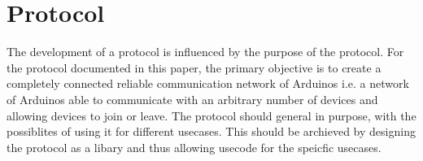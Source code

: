 \section{Protocol}
The development of a protocol is influenced by the purpose of the protocol.
For the protocol documented in this paper, the primary objective is to create a completely connected reliable communication network of Arduinos i.e. a network of Arduinos able to communicate with an arbitrary number of devices and allowing devices to join or leave.
The protocol should general in purpose, with the possiblites of using it for different usecases.
This should be archieved by designing the protocol as a libary and thus allowing usecode for the speicfic usecases.